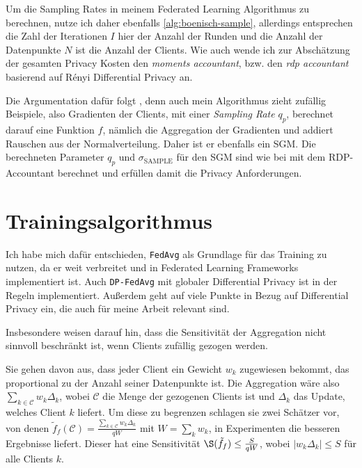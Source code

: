 Um die Sampling Rates in meinem Federated Learning Algorithmus zu berechnen, nutze ich daher ebenfalls \autoref{alg:boenisch-sample}, allerdings entsprechen die Zahl der Iterationen $I$ hier der Anzahl der Runden und die Anzahl der Datenpunkte $N$ ist die Anzahl der Clients. Wie auch \textcite{mcmahan:2018, boenisch:2023} wende ich zur Abschätzung der gesamten Privacy Kosten den \textit{moments accountant}, bzw. den \textit{rdp accountant} \cite{wang:2020} basierend auf Rényi Differential Privacy \cite{mironov:2017} an.

Die Argumentation dafür folgt \textcite{boenisch:2023}, denn auch mein Algorithmus zieht zufällig Beispiele, also Gradienten der Clients, mit einer \textit{Sampling Rate} $q_p$, berechnet darauf eine Funktion $f$, nämlich die Aggregation der Gradienten und addiert Rauschen aus der Normalverteilung. Daher ist er ebenfalls ein SGM. Die berechneten Parameter $q_p$ und $\sigma_{\text{SAMPLE}}$ für den SGM sind wie bei \citeauthor{boenisch:2023} mit dem RDP-Accountant berechnet und erfüllen damit die Privacy Anforderungen.

\section{Trainingsalgorithmus}
Ich habe mich dafür entschieden, \texttt{FedAvg} als Grundlage für das Training zu nutzen, da er weit verbreitet und in Federated Learning Frameworks implementiert ist. Auch \texttt{DP-FedAvg} mit globaler Differential Privacy \cite{mcmahan:2018} ist in der Regeln implementiert. Außerdem geht \textcite{mcmahan:2018} auf viele Punkte in Bezug auf Differential Privacy ein, die auch für meine Arbeit relevant sind. 

Insbesondere weisen \citeauthor{mcmahan:2018} darauf hin, dass die Sensitivität der Aggregation nicht sinnvoll beschränkt ist, wenn Clients zufällig gezogen werden. 

Sie gehen davon aus, dass jeder Client ein Gewicht $w_k$ zugewiesen bekommt, das proportional zu der Anzahl seiner Datenpunkte ist. Die Aggregation wäre also $\sum_{k \in \mathcal{C}} w_k \Delta_k$, wobei $\mathcal{C}$ die Menge der gezogenen Clients ist und $\Delta_k$ das Update, welches Client $k$ liefert. Um diese zu begrenzen schlagen sie zwei Schätzer vor, von denen $\tilde{f}_f(\mathcal{C}) = \frac{\sum_{k \in \mathcal{C}} w_k \Delta_k}{qW}$ mit $W = \sum_k{w_k}$, in Experimenten die besseren Ergebnisse liefert. Dieser hat eine Sensitivität $\S(\tilde{f}_f) \leq \frac{S}{qW}$, wobei $|w_k \Delta_k| \leq S$ für alle Clients $k$.

